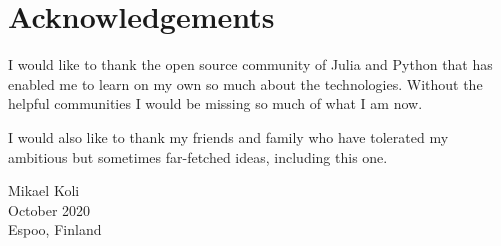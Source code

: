 \section*{Acknowledgements}

I would like to thank the open source community of Julia and Python
that has enabled me to learn on my own so much about the technologies.
Without the helpful communities I would be missing so much of what
I am now.

I would also like to thank my friends and family who have tolerated
my ambitious but sometimes far-fetched ideas, including this one. 

Mikael Koli\\
October 2020\\ %
Espoo, Finland\\

